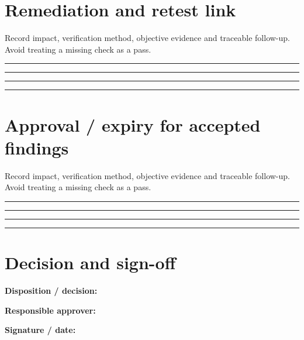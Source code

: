\documentclass[10pt,letterpaper]{article}
\begin{document}
\section{Remediation and retest link}
Record impact, verification method, objective evidence and traceable follow-up. Avoid treating a missing check as a pass.\par\medskip
\noindent\rule{\linewidth}{0.4pt}\par\vspace{16pt}
\noindent\rule{\linewidth}{0.4pt}\par\vspace{16pt}
\noindent\rule{\linewidth}{0.4pt}\par\vspace{16pt}
\noindent\rule{\linewidth}{0.4pt}\par\vspace{16pt}
\section{Approval / expiry for accepted findings}
Record impact, verification method, objective evidence and traceable follow-up. Avoid treating a missing check as a pass.\par\medskip
\noindent\rule{\linewidth}{0.4pt}\par\vspace{16pt}
\noindent\rule{\linewidth}{0.4pt}\par\vspace{16pt}
\noindent\rule{\linewidth}{0.4pt}\par\vspace{16pt}
\noindent\rule{\linewidth}{0.4pt}\par\vspace{16pt}
\section{Decision and sign-off}
\noindent\textbf{Disposition / decision:}\quad\hrulefill\par\vspace{11pt}
\noindent\textbf{Responsible approver:}\quad\hrulefill\par\vspace{11pt}
\noindent\textbf{Signature / date:}\quad\hrulefill\par\vspace{11pt}
\end{document}
